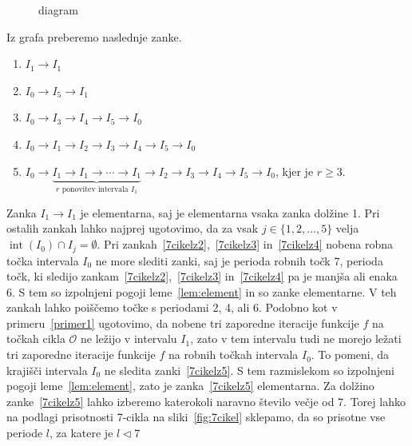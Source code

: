 \documentclass[mat2]{fmfdelo}
\DeclareMathOperator{\interior}{int}
\begin{document}
\begin{primer}[7-cikel]
\begin{figure}[h]
  \caption[Primer vektorske slike.]{diagram}
  \label{fig:6kotnik}
\end{figure}
Iz grafa preberemo naslednje zanke.
\begin{enumerate}[label={(\arabic*)}]
\item $I_1 \to I_1$
\item $I_0 \to I_5 \to I_1$ \label{7cikelz2}
\item $I_0 \to I_3 \to I_4 \to I_5 \to I_0$ \label{7cikelz3}
\item $I_0 \to I_1 \to I_2 \to I_3 \to I_4 \to I_5 \to I_0$ \label{7cikelz4}
\item $I_0 \to \underbrace{I_1 \to I_1 \to \cdots  \to I_1}_{r \text{ ponovitev intervala } I_1} \to I_2 \to I_3 \to I_4 \to I_5 \to I_0$, kjer je $r\geq 3$. \label{7cikelz5}
\end{enumerate}
Zanka $I_1 \to I_1$ je elementarna, saj je elementarna vsaka zanka dolžine 1. Pri ostalih zankah lahko najprej ugotovimo, da za vsak $j \in \{1, 2, \dots, 5\}$ velja $\interior(I_0) \cap I_j = \emptyset$. Pri zankah~\ref{7cikelz2},~\ref{7cikelz3} in~\ref{7cikelz4} nobena robna točka intervala $I_0$ ne more slediti zanki, saj je perioda robnih točk 7, perioda točk, ki sledijo zankam~\ref{7cikelz2},~\ref{7cikelz3} in~\ref{7cikelz4} pa je manjša ali enaka 6. S tem so izpolnjeni pogoji leme~\ref{lem:element} in so zanke elementarne. V teh zankah lahko poiščemo točke s periodami 2, 4, ali 6. Podobno kot v primeru~\ref{primer1} ugotovimo, da nobene tri zaporedne iteracije funkcije $f$ na točkah cikla $\mathcal{O}$ ne ležijo v intervalu $I_1$, zato v tem intervalu tudi ne morejo ležati tri zaporedne iteracije funkcije $f$ na robnih točkah intervala $I_0$. To pomeni, da krajišči intervala $I_0$ ne sledita zanki~\ref{7cikelz5}. S tem razmislekom so izpolnjeni pogoji leme~\ref{lem:element}, zato je zanka~\ref{7cikelz5} elementarna. Za dolžino zanke~\ref{7cikelz5} lahko izberemo katerokoli naravno število večje od 7. Torej lahko na podlagi prisotnosti 7-cikla na sliki~\ref{fig:7cikel} sklepamo, da so prisotne vse periode $l$, za katere je $l \triangleleft 7$
\end{primer}
\end{document}

